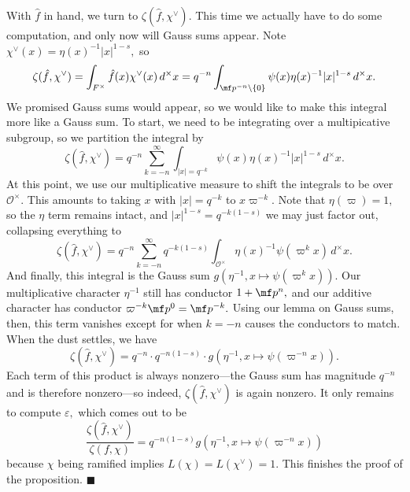 With $\hat f$ in hand, we turn to $\zeta(\hat f,\chi^\vee).$ This time we actually have to do some computation, and only now will Gauss sums appear. Note $\chi^\vee(x)=\eta(x)^{-1}|x|^{1-s},$ so
\[\zeta(\hat f,\chi^\vee)=\int_{F^\times}\hat f(x)\chi^\vee(x)\,d^\times x=q^{-n}\int_{\mf p^{-n}\setminus\{0\}}\psi(x)\eta(x)^{-1}|x|^{1-s}\,d^\times x.\]
We promised Gauss sums would appear, so we would like to make this integral more like a Gauss sum. To start, we need to be integrating over a multipicative subgroup, so we partition the integral by
\[\zeta(\hat f,\chi^\vee)=q^{-n}\sum_{k=-n}^\infty\int_{|x|=q^{-k}}\psi(x)\eta(x)^{-1}|x|^{1-s}\,d^\times x.\]
At this point, we use our multiplicative measure to shift the integrals to be over $\mathcal O^\times.$ This amounts to taking $x$ with $|x|=q^{-k}$ to $x\varpi^{-k}.$ Note that $\eta(\varpi)=1,$ so the $\eta$ term remains intact, and $|x|^{1-s}=q^{-k(1-s)}$ we may just factor out, collapsing everything to
\[\zeta(\hat f,\chi^\vee)=q^{-n}\sum_{k=-n}^\infty q^{-k(1-s)}\int_{\mathcal O^\times}\eta(x)^{-1}\psi\left(\varpi^kx\right)\,d^\times x.\]
And finally, this integral is the Gauss sum $g\left(\eta^{-1},x\mapsto\psi\left(\varpi^kx\right)\right).$ Our multiplicative character $\eta^{-1}$ still has conductor $1+\mf p^n,$ and our additive character has conductor $\varpi^{-k}\mf p^0=\mf p^{-k}.$ Using our lemma on Gauss sums, then, this term vanishes except for when $k=-n$ causes the conductors to match. When the dust settles, we have
\[\zeta(\hat f,\chi^\vee)=q^{-n}\cdot q^{-n(1-s)}\cdot g\left(\eta^{-1},x\mapsto\psi\left(\varpi^{-n}x\right)\right).\]
Each term of this product is always nonzero---the Gauss sum has magnitude $q^{-n}$ and is therefore nonzero---so indeed, $\zeta(\hat f,\chi^\vee)$ is again nonzero. It only remains to compute $\varepsilon,$ which comes out to  be
\[\frac{\zeta(\hat f,\chi^\vee)}{\zeta(f,\chi)}=q^{-n(1-s)}g\left(\eta^{-1},x\mapsto\psi\left(\varpi^{-n}x\right)\right)\]
because $\chi$ being ramified implies $L(\chi)=L(\chi^\vee)=1.$ This finishes the proof of the proposition. $\blacksquare$

